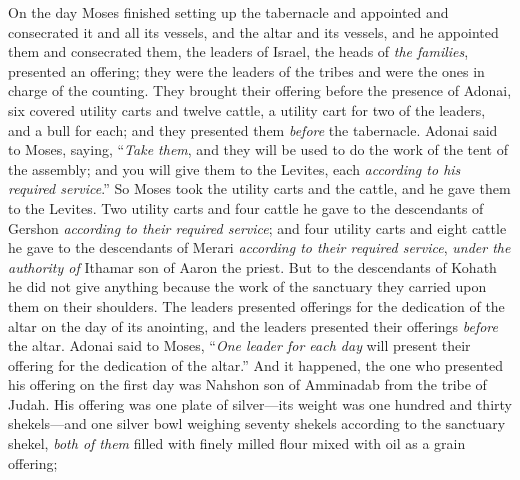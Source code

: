 \begin{biblechapter} %
 On the day Moses finished setting up the tabernacle and appointed and consecrated it and all its vessels, and the altar and its vessels, and he appointed them and consecrated them,
\verse the leaders of Israel, the heads of \textit{the families}, presented an offering; they were the leaders of the tribes and were the ones in charge of the counting.
\verse They brought their offering before the presence of Adonai, six covered utility carts and twelve cattle, a utility cart for two of the leaders, and a bull for each; and they presented them \textit{before} the tabernacle.
\verse Adonai said to Moses, saying,
\verse “\textit{Take them}, and they will be used to do the work of the tent of the assembly; and you will give them to the Levites, each \textit{according to his required service}.”
\verse So Moses took the utility carts and the cattle, and he gave them to the Levites.
\verse Two utility carts and four cattle he gave to the descendants of Gershon \textit{according to their required service};
\verse and four utility carts and eight cattle he gave to the descendants of Merari \textit{according to their required service}, \textit{under the authority of} Ithamar son of Aaron the priest.
\verse But to the descendants of Kohath he did not give anything because the work of the sanctuary they carried upon them on their shoulders.
\verse The leaders presented offerings for the dedication of the altar on the day of its anointing, and the leaders presented their offerings \textit{before} the altar.
\verse Adonai said to Moses, “\textit{One leader for each day} will present their offering for the dedication of the altar.”
\verse And it happened, the one who presented his offering on the first day was Nahshon son of Amminadab from the tribe of Judah.
\verse His offering was one plate of silver—its weight was one hundred and thirty shekels—and one silver bowl weighing seventy shekels according to the sanctuary shekel, \textit{both of them} filled with finely milled flour mixed with oil as a grain offering;

\end{biblechapter}
